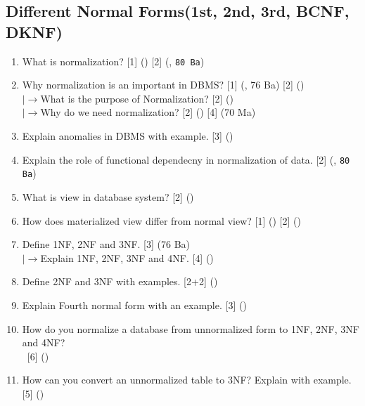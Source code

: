\documentclass[12pt]{article}
\newcommand{\lb}{\\$\left|\rightarrow\right.$}
\newcommand{\enter}{\\\textcolor{white}{1}}
\begin{document}
    \subsection{Different Normal Forms(1st, 2nd, 3rd, BCNF, DKNF)}
    \begin{enumerate}[noitemsep, topsep = 0pt]
        \item What is normalization? \hfill [1] () [2] (, \texttt{80 Ba})
        
        \item Why normalization is an important in DBMS? \hfill [1] (, 76 Ba) [2] ()
        \lb What is the purpose of Normalization? \hfill [2] ()
        \lb Why do we need normalization? \hfill [2] () [4] (70 Ma)
        
        \item Explain anomalies in DBMS with example. \hfill [3] ()
        
        \item Explain the role of functional dependecny in normalization of data. \hfill [2] (, \texttt{80 Ba})
        
        \item What is view in database system? \hfill [2] ()
        
        \item How does materialized view differ from normal view? \hfill [1] () [2] ()
        
        \item Define 1NF, 2NF and 3NF. \hfill [3] (76 Ba)
        \lb  Explain 1NF, 2NF, 3NF and 4NF. \hfill [4] ()
        
        \item Define 2NF and 3NF with examples. \hfill [2+2] ()
        
        \item Explain Fourth normal form with an example. \hfill [3] ()
        
        \item How do you normalize a database from unnormalized form to 1NF, 2NF, 3NF and 4NF?
        \enter\hfill [6] ()
        
        \item How can you convert an unnormalized table to 3NF? Explain with example. \hfill [5] ()
        

\end{enumerate}
\end{document}

